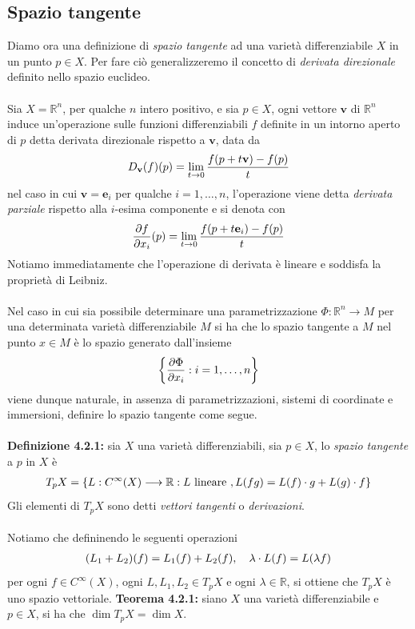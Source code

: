 \documentclass{article}
\begin{document}
\subsection{Spazio tangente}
Diamo ora una definizione di \textit{spazio tangente} ad una varietà differenziabile $X$ in un punto $p \in X$. Per fare ciò generalizzeremo il concetto di \textit{derivata direzionale} definito nello spazio euclideo. \\ \\
Sia $X = \mathbb{R}^n$, per qualche $n$ intero positivo, e sia $p \in X$, ogni vettore $\mathbf{v}$ di $\mathbb{R}^n$ induce un'operazione sulle funzioni differenziabili $f$ definite in un intorno aperto di $p$ detta derivata direzionale rispetto a $\mathbf{v}$, data da
\begin{gather}
    D_{\mathbf{v}}(f)(p) = \lim_{t \rightarrow 0} \frac{f(p + t\mathbf{v}) - f(p)}{t} \notag
\end{gather}
nel caso in cui $\mathbf{v} = \mathbf{e}_i$ per qualche $i = 1, \dots, n$, l'operazione viene detta \textit{derivata parziale} rispetto alla $i$-esima componente e si denota con
\begin{gather}
    \frac{\partial f}{\partial x_i}(p) = \lim_{t \rightarrow 0} \frac{f(p + t\mathbf{e}_i) - f(p)}{t} \notag
\end{gather}
Notiamo immediatamente che l'operazione di derivata è lineare e soddisfa la proprietà di Leibniz. \\ \\
Nel caso in cui sia possibile determinare una parametrizzazione $\Phi : \mathbb{R}^n \longrightarrow M$ per una determinata varietà differenziabile $M$ si ha che lo spazio tangente a $M$ nel punto $x \in M$ è lo spazio generato dall'insieme
\begin{gather}
    \left\{ \frac{\partial \Phi}{\partial x_i} : i = 1, \dots, n \right\} \notag
\end{gather}
viene dunque naturale, in assenza di parametrizzazioni, sistemi di coordinate e immersioni, definire lo spazio tangente come segue. \\ \\
\textbf{Definizione 4.2.1:} sia $X$ una varietà differenziabili, sia $p \in X$, lo \textit{spazio tangente} a $p$ in $X$ è
\begin{gather}
    T_pX = \{ L : C^{\infty}(X) \longrightarrow \mathbb{R} : L \text{ lineare }, L(fg) = L(f) \cdot g + L(g) \cdot f \} \notag
\end{gather}
Gli elementi di $T_pX$ sono detti \textit{vettori tangenti} o \textit{derivazioni}. \\ \\
Notiamo che defininendo le seguenti operazioni
\begin{gather}
    (L_1 + L_2)(f) = L_1(f) + L_2(f), \quad \lambda \cdot L(f) = L(\lambda f) \notag
\end{gather}
per ogni $f \in C^{\infty}(X)$, ogni $L, L_1, L_2 \in T_pX$ e ogni $\lambda \in \mathbb{R}$, si ottiene che $T_pX$ è uno spazio vettoriale.
\newpage
\textbf{Teorema 4.2.1:} siano $X$ una varietà differenziabile e $p \in X$, si ha che $\dim T_pX = \dim X$. \\
\end{document}
